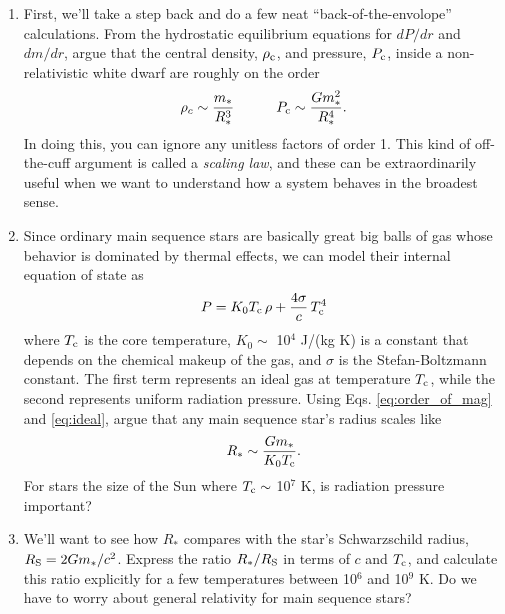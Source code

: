\documentclass[11pt]{article}
\begin{document}
\vspace{5pt}

\begin{enumerate}

\item First, we'll take a step back and do a few neat ``back-of-the-envolope'' calculations. From the hydrostatic equilibrium equations for $dP/dr$ and $dm/dr$, argue that the central density, $\rho_{\rm c}$, and pressure, $P_{\rm c}$, inside a non-relativistic white dwarf are roughly on the order
\begin{equation}\label{eq:order_of_mag}
\rho_c \sim \frac{m_*}{R_*^3} \hspace{30pt} P_{\rm c} \sim \frac{Gm_*^2}{R_*^4}.
\end{equation}
In doing this, you can ignore any unitless factors of order 1. This kind of off-the-cuff argument is called a \textit{scaling law}, and these can be extraordinarily useful when we want to understand how a system behaves in the broadest sense.

\item Since ordinary main sequence stars are basically great big balls of gas whose behavior is dominated by thermal effects, we can model their internal equation of state as
\begin{equation}\label{eq:ideal}
P = K_0 T_{\rm c} \, \rho + \frac{4\sigma}{c} \, T_{\rm c}^4
\end{equation}
where $T_{\rm c}$ is the core temperature, $K_0 \sim$ 10$^4$ J/(kg K) is a constant that depends on the chemical makeup of the gas, and $\sigma$ is the Stefan-Boltzmann constant. The first term represents an ideal gas at temperature $T_{\rm c}$, while the second represents uniform radiation pressure. Using Eqs. \ref{eq:order_of_mag} and \ref{eq:ideal}, argue that any main sequence star's radius scales like
\begin{equation}\label{eq:m_R_stellar}
R_* \sim \frac{G m_*}{K_0 T_{\rm c}}.
\end{equation}
For stars the size of the Sun where $T_{\rm c} \sim$ 10$^7$ K, is radiation pressure important?

\item We'll want to see how $R_*$ compares with the star's Schwarzschild radius, $R_{\rm S} = 2Gm_*/c^2$. Express the ratio $R_*/R_{\rm S}$ in terms of $c$ and $T_{\rm c}$, and calculate this ratio explicitly for a few temperatures between 10$^6$ and 10$^9$ K. Do we have to worry about general relativity for main sequence stars?


\end{enumerate}
\end{document}
